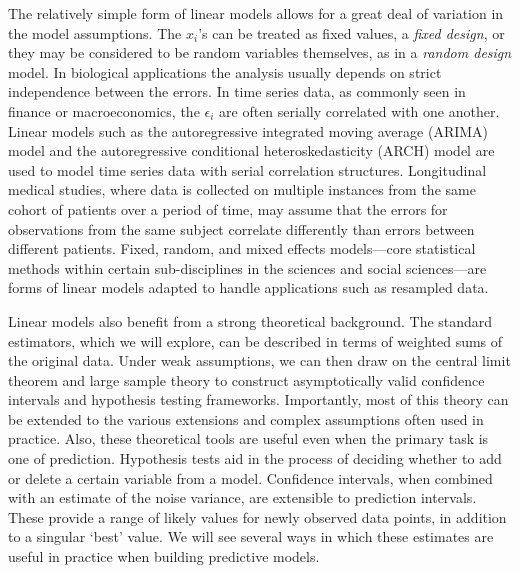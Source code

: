 \documentclass[12pt,hidelinks]{article}
\numberwithin{equation}{section}
\begin{document}
The relatively simple form of linear models allows for a
great deal of variation in the model assumptions. The $x_i$'s can
be treated as fixed values, a \textit{fixed design}, or they may
be considered to be random variables themselves, as in a
\textit{random design} model. In biological
applications the analysis usually depends on strict independence
between the errors. In time series data, as commonly seen in finance or macroeconomics,
the $\epsilon_i$ are often serially correlated with one another.
Linear models such as the autoregressive integrated
moving average (ARIMA) model and the autoregressive conditional heteroskedasticity
(ARCH) model are used to model time series data with serial correlation
structures. Longitudinal medical studies, where data is collected on
multiple instances from the same cohort of patients over a period of
time, may assume that the errors for observations from the
same subject correlate differently than errors between different
patients. Fixed, random, and mixed effects
models---core statistical methods within certain sub-disciplines in
the sciences and social sciences---are forms of linear models adapted
to handle applications such as resampled data.

Linear models also benefit from a strong theoretical background. The
standard estimators, which we will explore,
can be described in terms of weighted sums of the original data. Under
weak assumptions, we can then draw on the central limit theorem and
large sample theory to construct asymptotically valid confidence
intervals and hypothesis testing frameworks. Importantly, most of this
theory can be extended to the various extensions and complex assumptions
often used in practice. Also, these theoretical tools are useful even
when the primary task is one of prediction. Hypothesis tests aid in
the process of deciding whether to add
or delete a certain variable from a model. Confidence intervals, when
combined with an estimate of the noise variance, are extensible to
prediction intervals. These provide a range of likely values for newly
observed data points, in addition to a singular `best' value. We
will see several ways in which these estimates are useful in practice
when building predictive models.
\end{document}
